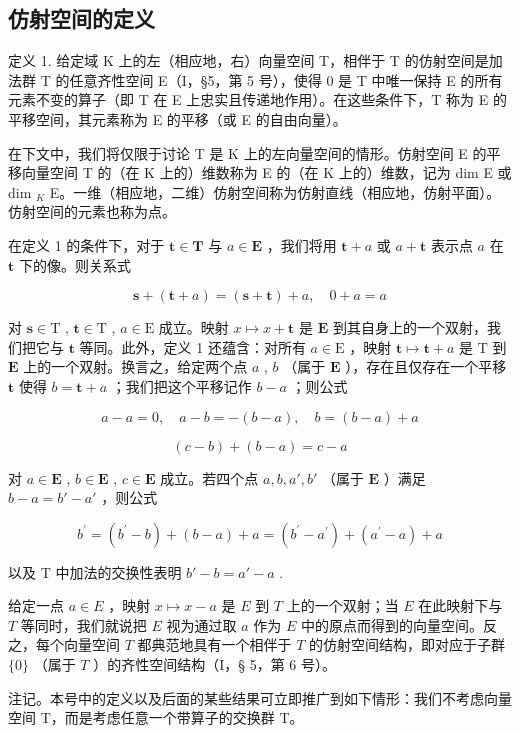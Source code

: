 \subsection{仿射空间的定义}

定义 1. 给定域 K 上的左（相应地，右）向量空间 T，相伴于 T 的仿射空间是加法群 T 的任意齐性空间 E（I，§5，第 5 号），使得 0 是 T 中唯一保持 E 的所有元素不变的算子（即 T 在 E 上忠实且传递地作用）。在这些条件下，T 称为 E 的平移空间，其元素称为 E 的平移（或 E 的自由向量）。

在下文中，我们将仅限于讨论 T 是 K 上的左向量空间的情形。仿射空间 E 的平移向量空间 T 的（在 K 上的）维数称为 E 的（在 K 上的）维数，记为 dim E 或 dim \(_{K}\) E。一维（相应地，二维）仿射空间称为仿射直线（相应地，仿射平面）。仿射空间的元素也称为点。

在定义 1 的条件下，对于 \(\mathbf{t} \in \mathbf{T}\) 与 \(a \in \mathbf{E}\) ，我们将用 \(\mathbf{t} + a\) 或 \(a + \mathbf{t}\) 表示点 \(a\) 在 \(\mathbf{t}\) 下的像。则关系式

\[
\mathbf {s} + (\mathbf {t} + a) = (\mathbf {s} + \mathbf {t}) + a, \quad 0 + a = a\tag{1}
\]

对 \(\mathbf{s} \in \mathrm{T}\) , \(\mathbf{t} \in \mathrm{T}\) , \(a \in \mathrm{E}\) 成立。映射 \(x \mapsto x + \mathbf{t}\) 是 \(\mathbf{E}\) 到其自身上的一个双射，我们把它与 \(\mathbf{t}\) 等同。此外，定义 1 还蕴含：对所有 \(a \in \mathrm{E}\) ，映射 \(\mathbf{t} \mapsto \mathbf{t} + a\) 是 \(\mathrm{T}\) 到 \(\mathbf{E}\) 上的一个双射。换言之，给定两个点 \(a\) , \(b\) （属于 \(\mathbf{E}\) ），存在且仅存在一个平移 \(\mathbf{t}\) 使得 \(b = \mathbf{t} + a\) ；我们把这个平移记作 \(b - a\) ；则公式

\[
a - a = 0, \quad a - b = - (b - a), \quad b = (b - a) + a\tag{2}
\]

\[
(c - b) + (b - a) = c - a
\]

对 \(a \in \mathbf{E}\) , \(b \in \mathbf{E}\) , \(c \in \mathbf{E}\) 成立。若四个点 \(a, b, a', b'\) （属于 \(\mathbf{E}\) ）满足 \(b - a = b' - a'\) ，则公式

\[
b ^ {\prime} = \left(b ^ {\prime} - b\right) + (b - a) + a = \left(b ^ {\prime} - a ^ {\prime}\right) + \left(a ^ {\prime} - a\right) + a
\]

以及 T 中加法的交换性表明 \(b' - b = a' - a\) .

给定一点 \(a \in E\) ，映射 \(x \mapsto x - a\) 是 \(E\) 到 \(T\) 上的一个双射；当 \(E\) 在此映射下与 \(T\) 等同时，我们就说把 \(E\) 视为通过取 \(a\) 作为 \(E\) 中的原点而得到的向量空间。反之，每个向量空间 \(T\) 都典范地具有一个相伴于 \(T\) 的仿射空间结构，即对应于子群 \(\{0\}\) （属于 \(T\) ）的齐性空间结构（I，§ 5，第 6 号）。

注记。本号中的定义以及后面的某些结果可立即推广到如下情形：我们不考虑向量空间 T，而是考虑任意一个带算子的交换群 T。

